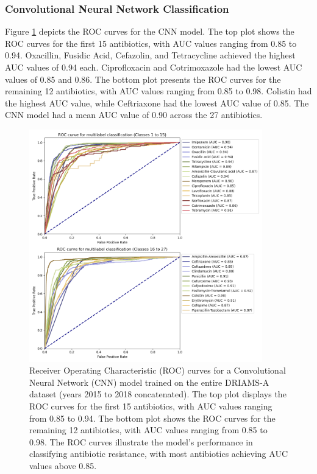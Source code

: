 \documentclass[english,11pt,a4paper,titlepage]{article}
\begin{document}
\subsubsection*{Convolutional Neural Network Classification}
Figure \ref{fig:ROC_cnn} depicts the ROC curves for the CNN model. The top plot shows the ROC curves for the first 15 antibiotics, with AUC values ranging from 0.85 to 0.94. Oxacillin, Fusidic Acid, Cefazolin, and Tetracycline achieved the highest AUC values of 0.94 each. Ciprofloxacin and Cotrimoxazole had the lowest AUC values of 0.85 and 0.86. The bottom plot presents the ROC curves for the remaining 12 antibiotics, with AUC values ranging from 0.85 to 0.98. Colistin had the highest AUC value, while Ceftriaxone had the lowest AUC value of 0.85. The CNN model had a mean AUC value of 0.90 across the 27 antibiotics.

\begin{figure}[h!]
	\centering
	\includegraphics[width=0.9\textwidth]{img/FBeta_SiLU_ROC_curve.png}
	\caption{Receiver Operating Characteristic (ROC) curves for a Convolutional Neural Network (CNN) model trained on the entire DRIAMS-A dataset (years 2015 to 2018 concatenated). The top plot displays the ROC curves for the first 15 antibiotics, with AUC values ranging from 0.85 to 0.94. The bottom plot shows the ROC curves for the remaining 12 antibiotics, with AUC values ranging from 0.85 to 0.98. The ROC curves illustrate the model's performance in classifying antibiotic resistance, with most antibiotics achieving AUC values above 0.85.}
	\label{fig:ROC_cnn}
\end{figure}
\end{document}
